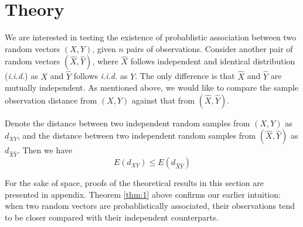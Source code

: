 \documentclass{sig-alternate}
\begin{document}
\section{Theory}
\label{sec:funcs}


We are interested in testing the existence of probablistic association
between two random vectors $(X,Y)$, given $n$ pairs of observations.
Consider another pair of random vectors $(\hat{X}, \hat{Y})$, where
$\hat{X}$ follows independent and identical distribution
(\emph{i.i.d.}) as $X$ and $\hat{Y}$ follows \emph{i.i.d.} as $Y$. The
only difference is that $\hat{X}$ and $\hat{Y}$ are mutually
independent. As mentioned above, we would like to compare the sample
observation distance from $(X,Y)$ against that from
$(\hat{X},\hat{Y})$.
\begin{thm}
  \label{thm:1}
  Denote the distance between two independent random samples from
  $(X,Y)$ as $d_{XY}$, and the distance between two independent random
  samples from $(\hat{X},\hat{Y})$ as $d_{\hat{X}\hat{Y}}$. Then we
  have
  \begin{displaymath}
    E(d_{XY}) \le E(d_{\hat{X}\hat{Y}})
  \end{displaymath}
\end{thm}
For the sake of space, proofs of the theoretical results in this
section are presented in appendix. Theorem \ref{thm:1}
above confirms our earlier intuition: when two random vectors are
probablistically associated, their observations tend to be closer
compared with their independent counterparts. 
\end{document}
